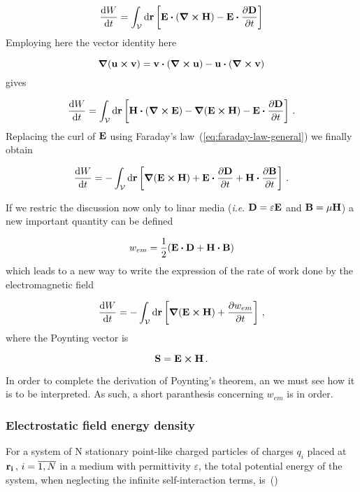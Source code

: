 \documentclass[12pt, class=report, crop=false]{standalone}
\begin{document}
\begin{equation*}
  \dv{W}{t} = \int_\mathcal{V} \dd{\vb{r}} \left[ \vb{E}\vdot (\curl{\vb{H}}) - \vb{E}\vdot \pdv{\vb{D}}{t} \right]
\end{equation*}
Employing here the vector identity here

\begin{equation}
  \label{id:grad-of-vector-product}
  \grad{(\vb{u}\cp\vb{v})} = \vb{v}\vdot(\curl{\vb{u}})-\vb{u}\vdot(\curl{\vb{v}})
\end{equation}
gives

\begin{equation*}
  \dv{W}{t} = \int_\mathcal{V} \dd{\vb{r}} \left[ \vb{H}\vdot (\curl{\vb{E}}) - \grad{(\vb{E}\cp\vb{H})} - \vb{E}\vdot \pdv{\vb{D}}{t} \right] \,.
\end{equation*}
Replacing the curl of \( \vb{E}\) using Faraday's law~(\ref{eq:faraday-law-general}) we finally obtain

\begin{equation*}
  \dv{W}{t} = - \int_\mathcal{V} \dd{\vb{r}} \left[ \grad{(\vb{E}\cp\vb{H})} + \vb{E}\vdot \pdv{\vb{D}}{t} + \vb{H}\vdot \pdv{\vb{B}}{t} \right] \,.
\end{equation*}

If we restric the discussion now only to linar media (\textit{i}.\textit{e}. \(\vb{D}=\varepsilon \vb{E}\) and \(\vb{B} = \mu \vb{H}\)) a new important quantity can be defined

\begin{equation}
  \label{def:energy-density}
  w_{em} = \frac{1}{2} (\vb{E}\vdot\vb{D}+\vb{H}\vdot\vb{B})
\end{equation}
which leads to a new way to write the expression of the rate of work done by the electromagnetic field

\begin{equation}
  \label{th:poynting-0}
  \dv{W}{t} = - \int_\mathcal{V} \dd{\vb{r}} \left[\grad{(\vb{E}\cp\vb{H})} + \pdv{w_{em}}{t}\right] \,,
\end{equation}
where the Poynting vector is

\begin{equation}
  \label{def:poynting-vector}
  \vb{S}=\vb{E}\cp\vb{H}\,.
\end{equation}

In order to complete the derivation of Poynting's theorem, an we must see how it is to be interpreted. As such, a short paranthesis concerning \( w_{em}\) is in order.

\subsubsection{Electrostatic field energy density}
For a system of N stationary point-like charged particles of charges \(q_{i}\) placed at \(\vb{r_{i}} \,,\,i=\overline{1,N}\) in a medium with permittivity \(\varepsilon\), the total potential energy of the system, when neglecting the infinite self-interaction terms, is~(\cite{jacksonClassicalElectrodynamics1999})
\end{document}
